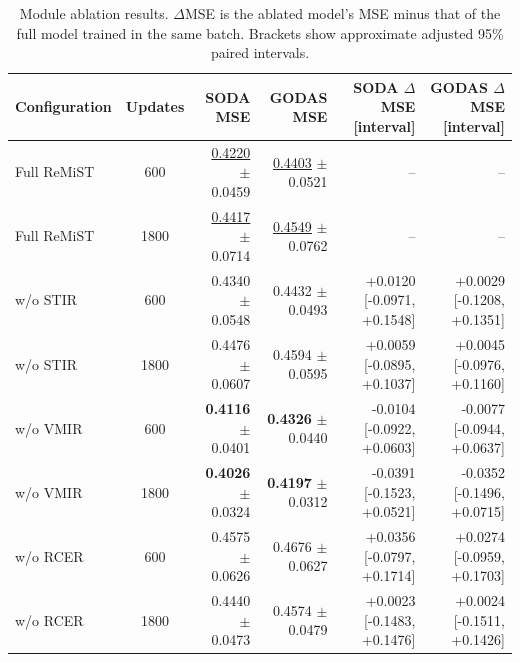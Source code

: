 \begin{table}[!t]
\centering\footnotesize
\caption{Module ablation results. $\Delta$MSE is the ablated model's MSE minus that of the full model trained in the same batch. Brackets show approximate adjusted 95\% paired intervals.}
\label{tab:modules}
\begin{tabular}{lcrrrr}
\toprule
Configuration & Updates & SODA MSE & GODAS MSE & SODA $\Delta$MSE [interval] & GODAS $\Delta$MSE [interval] \\
\midrule
Full ReMiST & 600 & \underline{0.4220} $\pm$ 0.0459 & \underline{0.4403} $\pm$ 0.0521 & -- & -- \\
Full ReMiST & 1800 & \underline{0.4417} $\pm$ 0.0714 & \underline{0.4549} $\pm$ 0.0762 & -- & -- \\
w/o STIR & 600 & 0.4340 $\pm$ 0.0548 & 0.4432 $\pm$ 0.0493 & +0.0120 [-0.0971, +0.1548] & +0.0029 [-0.1208, +0.1351] \\
w/o STIR & 1800 & 0.4476 $\pm$ 0.0607 & 0.4594 $\pm$ 0.0595 & +0.0059 [-0.0895, +0.1037] & +0.0045 [-0.0976, +0.1160] \\
w/o VMIR & 600 & \textbf{0.4116} $\pm$ 0.0401 & \textbf{0.4326} $\pm$ 0.0440 & -0.0104 [-0.0922, +0.0603] & -0.0077 [-0.0944, +0.0637] \\
w/o VMIR & 1800 & \textbf{0.4026} $\pm$ 0.0324 & \textbf{0.4197} $\pm$ 0.0312 & -0.0391 [-0.1523, +0.0521] & -0.0352 [-0.1496, +0.0715] \\
w/o RCER & 600 & 0.4575 $\pm$ 0.0626 & 0.4676 $\pm$ 0.0627 & +0.0356 [-0.0797, +0.1714] & +0.0274 [-0.0959, +0.1703] \\
w/o RCER & 1800 & 0.4440 $\pm$ 0.0473 & 0.4574 $\pm$ 0.0479 & +0.0023 [-0.1483, +0.1476] & +0.0024 [-0.1511, +0.1426] \\
\bottomrule
\end{tabular}
\end{table}
